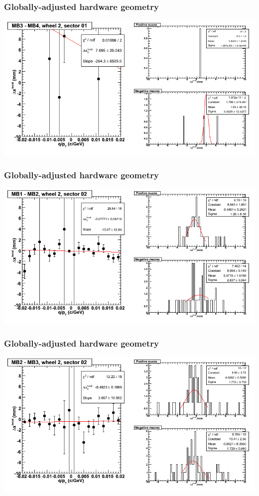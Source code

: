 \documentclass[compress]{beamer}
\begin{document}
\begin{frame}
\frametitle{Globally-adjusted hardware geometry}
\includegraphics[width=\linewidth]{NOV4_segdiffs_HW/dt13_resid_E_01_34.png}
\end{frame}

\begin{frame}
\frametitle{Globally-adjusted hardware geometry}
\includegraphics[width=\linewidth]{NOV4_segdiffs_HW/dt13_resid_E_02_12.png}
\end{frame}

\begin{frame}
\frametitle{Globally-adjusted hardware geometry}
\includegraphics[width=\linewidth]{NOV4_segdiffs_HW/dt13_resid_E_02_23.png}
\end{frame}
\end{document}

